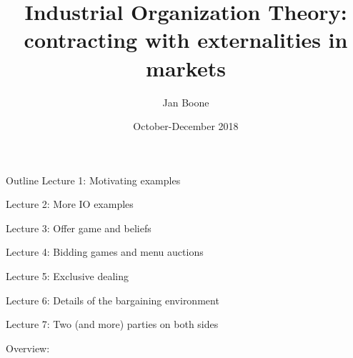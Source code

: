 \documentclass[11pt,english]{beamer}
\institute{Tilec}
\title{Industrial Organization Theory: contracting with externalities in markets}
\author{Jan Boone} \date{October-December 2018}
\begin{document}
\frame{\titlepage}

\begin{frame}[allowframebreaks]{Outline}
Lecture 1: Motivating examples

\tableofcontents[part=1,hideallsubsections]

\newpage

Lecture 2: More IO examples

\tableofcontents[part=2,hideallsubsections]


\newpage

Lecture 3: Offer game and beliefs

\tableofcontents[part=3,hideallsubsections]

Lecture 4: Bidding games and menu auctions

\tableofcontents[part=4,hideallsubsections]

\newpage

Lecture 5: Exclusive dealing

\tableofcontents[part=5,hideallsubsections]

Lecture 6: Details of the bargaining environment

\tableofcontents[part=6,hideallsubsections]

\newpage

Lecture 7: Two (and more) parties on both sides

\tableofcontents[part=7,hideallsubsections]

Overview:

\tableofcontents[part=8,hideallsubsections]

\end{frame}
\end{document}
